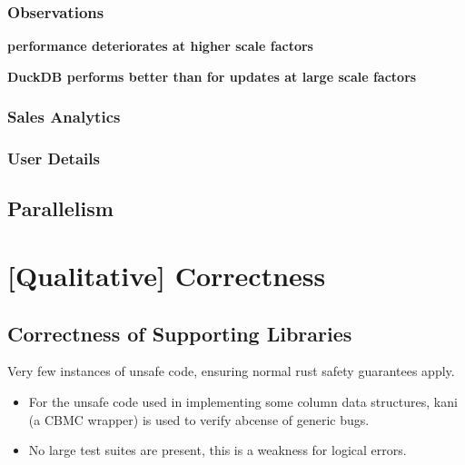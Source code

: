 \subsubsection{Observations}
\textbf{\emdb performance deteriorates at higher scale factors}
\begin{quote}

\end{quote}
\noindent
\textbf{DuckDB performs better than \emdb for updates at large scale factors}
\begin{quote}

\end{quote}
\noindent
\subsubsection{Sales Analytics}

\subsubsection{User Details}

\subsection{Parallelism}


\section{[Qualitative] Correctness}
\subsection{Correctness of Supporting Libraries}
Very few instances of unsafe code, ensuring normal rust safety guarantees apply.
\begin{itemize}
    \item For the unsafe code used in implementing some column data structures, kani\cite{KaniGithub} (a CBMC\cite{DiffBlueCBMC} wrapper) is used to verify abcense of generic bugs.
    \item No large test suites are present, this is a weakness for logical errors.
\end{itemize}

